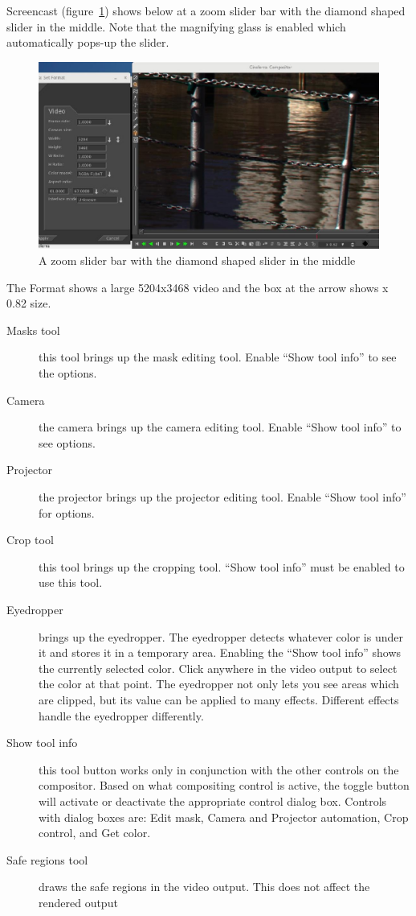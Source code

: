 Screencast (figure~\ref{fig:zoom_slider}) shows below at a zoom slider bar with the diamond shaped slider in the middle.  Note 
that the magnifying glass is  enabled which automatically pops-up the slider.

\begin{figure}[htpb]
    \centering
    \includegraphics[width=0.99\linewidth]{images/zoom_slider.png}
    \caption{A zoom slider bar with the diamond shaped slider in the middle}
    \label{fig:zoom_slider}
\end{figure}
The Format shows a large 5204x3468 video and the box at the arrow shows x 0.82 size.  

\begin{description}
    \item[Masks tool] this tool brings up the mask editing tool. Enable “Show tool info” to see the options.
    \item[Camera]  the camera brings up the camera editing tool. Enable “Show tool info” to see options.
    \item[Projector]  the projector brings up the projector editing tool. Enable “Show tool info” for options.
    \item[Crop tool]  this tool brings up the cropping tool. “Show tool info” must be enabled to use this tool.
    \item[Eyedropper]  brings up the eyedropper. The eyedropper detects whatever color is under it and stores it
        in a temporary area. Enabling the “Show tool info” shows the currently selected color. Click
        anywhere in the video output to select the color at that point. The eyedropper not only lets you see
        areas which are clipped, but its value can be applied to many effects. Different effects handle the
        eyedropper differently.
    \item[Show tool info]  this tool button works only in conjunction with the other controls on the compositor.
        Based on what compositing control is active, the toggle button will activate or deactivate the
        appropriate control dialog box. Controls with dialog boxes are: Edit mask, Camera and Projector
        automation, Crop control, and Get color.
    \item[Safe regions tool]  draws the safe regions in the video output. This does not affect the rendered output
\end{description}

